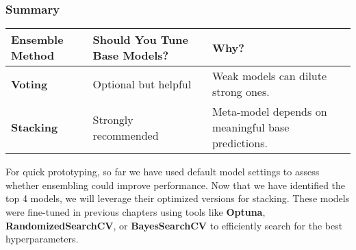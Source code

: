 \documentclass[
  letterpaper,
  DIV=11,
  numbers=noendperiod]{scrreprt}
\begin{document}
\subsubsection{Summary}\label{summary}

\begin{longtable}[]{@{}
  >{\raggedright\arraybackslash}p{}
  >{\raggedright\arraybackslash}p{}
  >{\raggedright\arraybackslash}p{}@{}}
\toprule\noalign{}
\begin{minipage}[b]{\linewidth}\raggedright
Ensemble Method
\end{minipage} & \begin{minipage}[b]{\linewidth}\raggedright
Should You Tune Base Models?
\end{minipage} & \begin{minipage}[b]{\linewidth}\raggedright
Why?
\end{minipage} \\
\midrule\noalign{}
\endhead
\bottomrule\noalign{}
\endlastfoot
\textbf{Voting} & Optional but helpful & Weak models can dilute strong
ones. \\
\textbf{Stacking} & Strongly recommended & Meta-model depends on
meaningful base predictions. \\
\end{longtable}

For quick prototyping, so far we have used default model settings to
assess whether ensembling could improve performance. Now that we have
identified the top 4 models, we will leverage their optimized versions
for stacking. These models were fine-tuned in previous chapters using
tools like \textbf{Optuna}, \textbf{RandomizedSearchCV}, or
\textbf{BayesSearchCV} to efficiently search for the best
hyperparameters.
\end{document}
